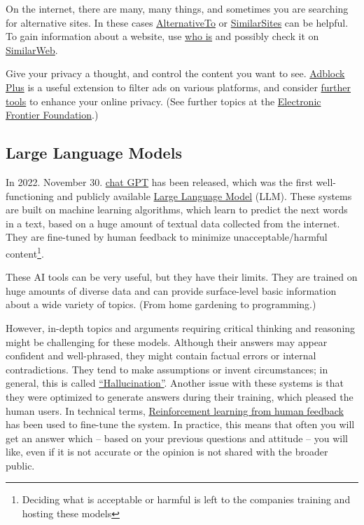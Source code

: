 \documentclass{article}
\begin{document}
On the internet, there are many, many things, and sometimes you are searching for alternative sites. In these cases \href{https://alternativeto.net/}{AlternativeTo} or \href{https://www.similarsites.com/}{SimilarSites} can be helpful.
To gain information about a website, use \href{http://whois.domaintools.com/}{who is} and possibly check it on \href{https://www.similarweb.com/}{SimilarWeb}.

Give your privacy a thought, and control the content you want to see. \href{https://adblockplus.org/}{Adblock Plus} is a useful extension to filter ads on various platforms, and consider \href{https://www.nytimes.com/wirecutter/reviews/our-favorite-ad-blockers-and-browser-extensions-to-protect-privacy/}{further tools} to enhance your online privacy. (See further topics at the \href{https://www.eff.org/issues/privacy}{Electronic Frontier Foundation}.)

\subsection{Large Language Models}

In 2022. November 30. \href{https://en.wikipedia.org/wiki/ChatGPT}{chat GPT} has been released, which was the first well-functioning and publicly available \href{https://en.wikipedia.org/wiki/Large_language_model}{Large Language Model} (LLM).
These systems are built on machine learning algorithms, which learn to predict the next words in a text, based on a huge amount of textual data collected from the internet. They are fine-tuned by human feedback to minimize unacceptable/harmful content\footnote{Deciding what is acceptable or harmful is left to the companies training and hosting these models}.

These AI tools can be very useful, but they have their limits.
They are trained on huge amounts of diverse data and can provide surface-level basic information about a wide variety of topics.
(From home gardening to programming.)

However, in-depth topics and arguments requiring critical thinking and reasoning might be challenging for these models. Although their answers may appear confident and well-phrased, they might contain factual errors or internal contradictions.
They tend to make assumptions or invent circumstances; in general, this is called \href{https://en.wikipedia.org/wiki/Hallucination_(artificial_intelligence)}{``Hallucination''}.
Another issue with these systems is that they were optimized to generate answers during their training, which pleased the human users.
In technical terms, \href{https://en.wikipedia.org/wiki/Reinforcement_learning_from_human_feedback}{Reinforcement learning from human feedback} has been used to fine-tune the system.
In practice, this means that often you will get an answer which -- based on your previous questions and attitude -- you will like, even if it is not accurate or the opinion is not shared with the broader public.
\end{document}
